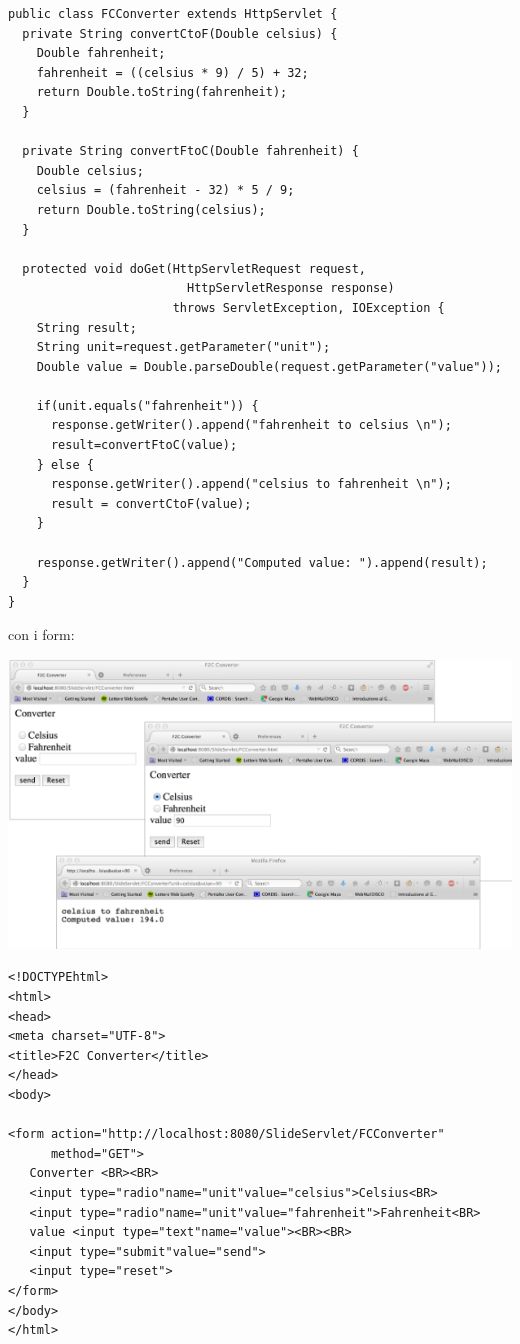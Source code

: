 \documentclass[a4paper,12pt, oneside]{book}
\begin{document}
\begin{verbatim}
public class FCConverter extends HttpServlet {
  private String convertCtoF(Double celsius) {
    Double fahrenheit;
    fahrenheit = ((celsius * 9) / 5) + 32;
    return Double.toString(fahrenheit);
  }
  
  private String convertFtoC(Double fahrenheit) {    
    Double celsius;
    celsius = (fahrenheit - 32) * 5 / 9;
    return Double.toString(celsius);
  }
  
  protected void doGet(HttpServletRequest request,
                         HttpServletResponse response) 
                       throws ServletException, IOException {
    String result;     
    String unit=request.getParameter("unit");
    Double value = Double.parseDouble(request.getParameter("value"));
    
    if(unit.equals("fahrenheit")) {
      response.getWriter().append("fahrenheit to celsius \n");
      result=convertFtoC(value);
    } else {
      response.getWriter().append("celsius to fahrenheit \n");
      result = convertCtoF(value);
    }
    
    response.getWriter().append("Computed value: ").append(result);
  }
}   
\end{verbatim}
con i form:
\begin{center}
	\includegraphics[scale=0.8]{img/cel3.png}
\end{center}
\begin{verbatim}
<!DOCTYPEhtml> 
<html> 
<head>
<meta charset="UTF-8">
<title>F2C Converter</title>
</head>
<body>

<form action="http://localhost:8080/SlideServlet/FCConverter"
      method="GET">
   Converter <BR><BR>
   <input type="radio"name="unit"value="celsius">Celsius<BR>
   <input type="radio"name="unit"value="fahrenheit">Fahrenheit<BR>
   value <input type="text"name="value"><BR><BR>
   <input type="submit"value="send">
   <input type="reset">
</form>
</body>
</html>
\end{verbatim}
\end{document}
